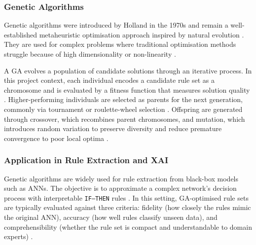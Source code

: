 \subsubsection{Genetic Algorithms}

Genetic algorithms were introduced by Holland in the 1970s \citep{holland1975} and remain a well-established metaheuristic optimisation approach inspired by natural evolution \citep{holland1975,yedjour2024}. They are used for complex problems where traditional optimisation methods struggle because of high dimensionality or non-linearity \citep{yedjour2024}.

A GA evolves a population of candidate solutions through an iterative process. In this project context, each individual encodes a candidate rule set as a chromosome and is evaluated by a fitness function that measures solution quality \citep{yedjour2024}. Higher-performing individuals are selected as parents for the next generation, commonly via tournament or roulette-wheel selection \citep{yedjour2024}. Offspring are generated through crossover, which recombines parent chromosomes, and mutation, which introduces random variation to preserve diversity and reduce premature convergence to poor local optima \citep{yedjour2024}.

\subsubsection{Application in Rule Extraction and XAI}

Genetic algorithms are widely used for rule extraction from black-box models such as ANNs. The objective is to approximate a complex network's decision process with interpretable \texttt{IF--THEN} rules \citep{yedjour2024}. In this setting, GA-optimised rule sets are typically evaluated against three criteria: fidelity (how closely the rules mimic the original ANN), accuracy (how well rules classify unseen data), and comprehensibility (whether the rule set is compact and understandable to domain experts) \citep{yedjour2024}.